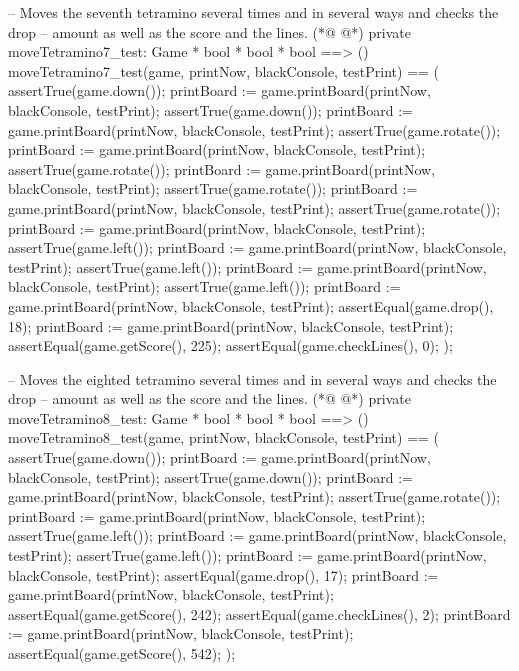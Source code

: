 \begin{vdmpp}[breaklines=true]
  -- Moves the seventh tetramino several times and in several ways and checks the drop
  -- amount as well as the score and the lines.
(*@
\label{moveTetramino7:test:452}
@*)
  private moveTetramino7_test: Game * bool * bool * bool ==> ()
  moveTetramino7_test(game, printNow, blackConsole, testPrint) == (
   assertTrue(game.down());
   printBoard := game.printBoard(printNow, blackConsole, testPrint);
   assertTrue(game.down());
   printBoard := game.printBoard(printNow, blackConsole, testPrint);
   assertTrue(game.rotate());
   printBoard := game.printBoard(printNow, blackConsole, testPrint);
   assertTrue(game.rotate());
   printBoard := game.printBoard(printNow, blackConsole, testPrint);
   assertTrue(game.rotate());
   printBoard := game.printBoard(printNow, blackConsole, testPrint);
   assertTrue(game.rotate());
   printBoard := game.printBoard(printNow, blackConsole, testPrint);
   assertTrue(game.left());
   printBoard := game.printBoard(printNow, blackConsole, testPrint);
   assertTrue(game.left());
   printBoard := game.printBoard(printNow, blackConsole, testPrint);
   assertTrue(game.left());
   printBoard := game.printBoard(printNow, blackConsole, testPrint);
   assertEqual(game.drop(), 18);
   printBoard := game.printBoard(printNow, blackConsole, testPrint);
   assertEqual(game.getScore(), 225);
   assertEqual(game.checkLines(), 0);
  );
  
  -- Moves the eighted tetramino several times and in several ways and checks the drop
  -- amount as well as the score and the lines.
(*@
\label{moveTetramino8:test:480}
@*)
  private moveTetramino8_test: Game * bool * bool * bool ==> ()
  moveTetramino8_test(game, printNow, blackConsole, testPrint) == (
   assertTrue(game.down());
   printBoard := game.printBoard(printNow, blackConsole, testPrint);
   assertTrue(game.down());
   printBoard := game.printBoard(printNow, blackConsole, testPrint);
   assertTrue(game.rotate());
   printBoard := game.printBoard(printNow, blackConsole, testPrint);
   assertTrue(game.left());
   printBoard := game.printBoard(printNow, blackConsole, testPrint);
   assertTrue(game.left());
   printBoard := game.printBoard(printNow, blackConsole, testPrint);
   assertEqual(game.drop(), 17);
   printBoard := game.printBoard(printNow, blackConsole, testPrint);
   assertEqual(game.getScore(), 242);
   assertEqual(game.checkLines(), 2);
   printBoard := game.printBoard(printNow, blackConsole, testPrint);
   assertEqual(game.getScore(), 542);
  );


\end{vdmpp}
